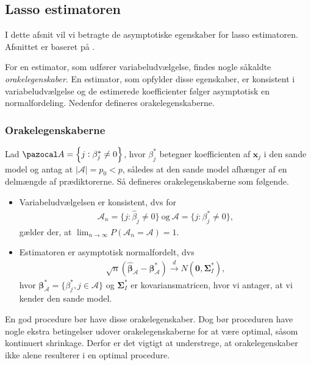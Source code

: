 \subsection{Lasso estimatoren}
I dette afsnit vil vi betragte de asymptotiske egenskaber for lasso estimatoren.
Afsnittet er baseret på \citep{adaptive_lasso}.

For en estimator, som udfører variabeludvælgelse, findes nogle såkaldte \textit{orakelegenskaber}.
En estimator, som opfylder disse egenskaber, er konsistent i variabeludvælgelse og de estimerede koefficienter følger asymptotisk en normalfordeling.
Nedenfor defineres orakelegenskaberne.

\subsubsection{Orakelegenskaberne} 
Lad $\mathcal{A} =\cbr{j:\beta_j^* \neq 0}$, hvor $\beta_j^*$ betegner koefficienten af $\mathbf{x}_j$ i den sande model og antag at $\vert \mathcal{A} \vert=p_0 <p$, således at den sande model afhænger af en delmængde af prædiktorerne. 
Så defineres orakelegenskaberne som følgende. 
\begin{defn}[Orakelegenskaber]
\begin{itemize}
\item Variabeludvælgelsen er konsistent, dvs for
\begin{align*}
\mathcal{A}_n=\lbrace j :\widehat{\beta}_j \neq 0 \rbrace \ \text{og} \ \mathcal{A} =\{j:\beta_j^* \neq 0\},
\end{align*}
gælder der, at $\lim_{n \rightarrow \infty }P(\mathcal{A}_n=\mathcal{A})=1$.
\item Estimatoren er asymptotisk normalfordelt, dvs
\begin{align*}
\sqrt{n}(\widehat{\boldsymbol{\beta}}_\mathcal{A}-\boldsymbol{\beta}^*_\mathcal{A}) \overset{d}{\rightarrow} N(\mathbf{0}, \boldsymbol{\Sigma}^*_I),
\end{align*}
hvor $\boldsymbol{\beta}^*_\mathcal{A}=\{ \beta_j^*, j \in \mathcal{A} \}$ og $\boldsymbol{\Sigma}^*_I$ er kovariansmatricen, hvor vi antager, at vi kender den sande model.
\end{itemize}
\end{defn}
En god procedure bør have disse orakelegenskaber.
Dog bør proceduren have nogle ekstra betingelser udover orakelegenskaberne for at være optimal, såsom kontinuert shrinkage.
Derfor er det vigtigt at understrege, at orakelegenskaber ikke alene resulterer i en optimal procedure.

